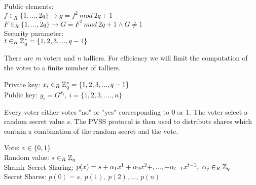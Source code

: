 \noindent
\begin{infobox}
Public elements:\\
\begin{math}f \in_R \{1,...,2q\} \rightarrow g= f^2 \ mod\ 2q+1\end{math}\\
\begin{math}F \in_R \{1,...,2q\}\rightarrow G= F^2 \ mod\ 2q+1 \wedge G\neq1\end{math}\\
Security parameter:\\
\begin{math} t \in_R \mathbb{Z}_q^* = \{1,2,3,...,q-1\} \end{math}
\end{infobox}


\noindent
There are \textit{m} voters and \textit{n} talliers. For efficiency we will limit the computation of the votes to a finite number of talliers. 

\noindent
\begin{infobox}
Private key: \begin{math}x_{i} \in_R \mathbb{Z}_q^* = \{1,2,3,...,q-1\}\end{math}\\
Public key: \begin{math}y_i=G^{x_i} ,\ i=\{1,2,3,...., n \}  \end{math}
\end{infobox}


\noindent
Every voter either votes "no" or "yes" corresponding to 0 or 1. The voter select a random secret value \begin{math}s \end{math}. The PVSS protocol is then used to distribute shares which contain a combination of the random secret and the vote.


\noindent
\begin{infobox}
Vote: \begin{math}v\in\{0,1\} \end{math}\\
Random value: \begin{math} s\in_R \mathbb{Z}_q \end{math}\\ 
Shamir Secret Sharing: \begin{math} p(x)=s+\alpha_1x^1+\alpha_2x^2+,...,+\alpha_{t-1}x^{t-1}, \ \alpha_j\in_R \Z_q  \end{math}\\
Secret Shares: \begin{math} p(0)=s,\ p(1),\ p(2),...,\ p(n) \end{math}
\end{infobox}

